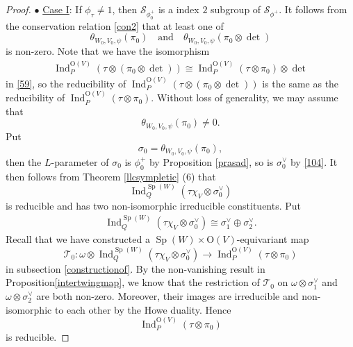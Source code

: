 \documentclass[article]{article}
\numberwithin{equation}{section}
\theoremstyle{definition}
\DeclareMathOperator{\Ind}{Ind}
\DeclareMathOperator{\SP}{Sp}
\begin{document}
\begin{proof}
	$\bullet$ \underline{Case I}: If $\phi_\tau\neq \mathrm 1$, then $\mathcal S_{\phi^+_{0}}$ is a index $2$ subgroup of $\mathcal S_{\phi^+}$. It follows from the conservation relation \ref{con2} that at least one of  
	$$\theta_{W_0,V_0,\psi}(\pi_0)\quad \mbox{and}\quad \theta_{W_0,V_0,\psi}(\pi_0\otimes\det)$$ 
	is non-zero. Note that we have the isomorphism 
	\begin{align*}
	\Ind_{P}^{\mathrm O(V)}\left(\tau \otimes (\pi_0\otimes\det)\right)\cong \Ind_{P}^{\mathrm O(V)}\left(\tau \otimes \pi_0\right)\otimes\det 
	\end{align*}
	in \ref{59}, so the reducibility of $\Ind_{P}^{\mathrm O(V)}\left(\tau \otimes (\pi_0\otimes\det)\right)$ is the same as the reducibility of $\Ind_{P}^{\mathrm O(V)}\left(\tau \otimes \pi_0\right)$. Without loss of generality, we may assume that
	$$\theta_{W_0,V_0,\psi}(\pi_0)\neq 0.$$ 
	Put $$\sigma_{0}=\theta_{W_0,V_0,\psi}(\pi_0),$$ then the $L$-parameter of $\sigma_0$ is $\phi_{0}^+$ by Proposition \ref{prasad}, so is $\sigma_{0}^\vee$ by \ref{104}. It then follows from Theorem \ref{llcsympletic} (6) that 
	$$
	\Ind_{Q}^{\SP(W)}(\tau\chi_{V}\otimes\sigma_{0}^{\vee})
	$$
	is reducible and has two non-isomorphic irreducible constituents. Put 
	\begin{align*}
	\Ind_{Q}^{\SP(W)}(\tau\chi_{V}\otimes\sigma_{0}^{\vee})\cong \sigma_1^\vee\oplus \sigma_2^\vee. 
	\end{align*}
	Recall that we have constructed a $\SP(W)\times\mathrm O(V)$-equivariant map
	$$\mathcal{T}_{0} : \omega \otimes \Ind_{Q}^{\SP(W)}\left(\tau\chi_{V} \otimes \sigma_{0}^{\vee}\right) \rightarrow \Ind_{P}^{\mathrm O(V)}\left(\tau \otimes \pi_0\right)$$ 
	in subsection \ref{constructionof}. By the non-vanishing result in Proposition\ref{intertwingmap}, we know that the restriction of $\mathcal T_0$ on $\omega\otimes\sigma_1^\vee$ and $\omega\otimes\sigma_2^\vee$ are both non-zero. Moreover, their images are irreducible and non-isomorphic to each other by the Howe duality. Hence $$\Ind_{P}^{\mathrm{O}\left(V\right)}\left(\tau  \otimes \pi_0\right)$$ is reducible.
	


\end{proof}
\end{document}

